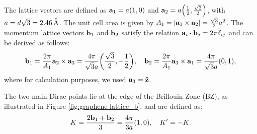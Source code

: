 The lattice vectors are defined as \(\vb{a}_1 = a \qty(1, 0)\) and \(\vb{a}_2 = a \qty(\frac{1}{2}, \frac{\sqrt{3}}{2})\), with $a = d\sqrt{3} = 2.46 \, \AA$. The unit cell area is given by \( A_1 = \abs{\a_1 \times \a_2} = \frac{\sqrt{3}}{2} a^2 \). The momentum lattice vectors \(\b_1\) and \(\b_2\) satisfy the relation \(\a_i \vdot \b_j = 2\pi \delta_{ij}\) and can be derived as follows:
\begin{equation} \label{eq:monolayer-bvecs}
\b_1 = \frac{2\pi}{A_1} \a_2 \times \a_3 = \frac{4\pi}{\sqrt{3} a } \qty(\frac{\sqrt{3}}{2}, -\frac{1}{2}), \quad
\b_2 = \frac{2\pi}{A_1} \a_3 \times \a_1 = \frac{4\pi}{\sqrt{3} a } \qty(0, 1),
\end{equation}
where for calculation purposes, we used \(\a_3 = \vu{z}\).

The two main Dirac points lie at the edge of the Brillouin Zone (BZ), as illustrated in Figure \ref{fig:graphene-lattice_b}, and are defined as:
\begin{equation} \label{eq:monolayer-dirac-points}
K = \frac{2\b_1 + \b_2}{3} = \frac{4\pi}{3a} (1, 0) , \quad K' = -K.
\end{equation}

